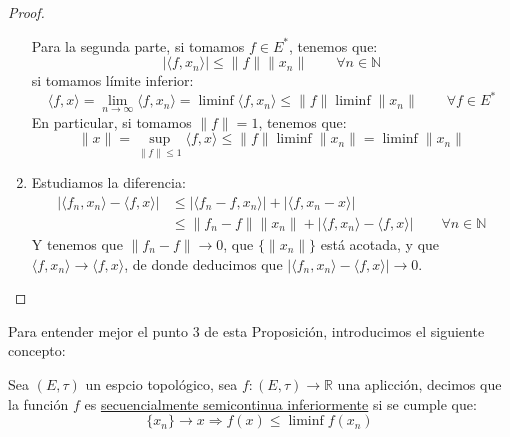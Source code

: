 \begin{prop}
\begin{proof}
\begin{enumerate}
                Para la segunda parte, si tomamos $f\in E^\ast$, tenemos que:
                \begin{equation*}
                    |\langle f,x_n \rangle | \leq \|f\|\|x_n\| \qquad \forall n\in \mathbb{N}
                \end{equation*}
                si tomamos límite inferior:
                \begin{equation*}
                    \langle f,x \rangle = \lim_{n\to\infty}\langle f,x_n \rangle  = \liminf \langle f,x_n \rangle  \leq \|f\|\liminf \|x_n\| \qquad \forall f\in E^\ast
                \end{equation*}
                En particular, si tomamos $\|f\| = 1$, tenemos que:
                \begin{equation*}
                    \|x\| = \sup_{\|f\|\leq 1}\langle f,x \rangle  \leq \|f\| \liminf \|x_n\| = \liminf \|x_n\|
                \end{equation*}
            \item Estudiamos la diferencia:
                \begin{align*}
                    |\langle f_n,x_n \rangle  - \langle f,x \rangle | &\leq |\langle f_n-f,x_n \rangle | + |\langle f,x_n-x \rangle |  \\
                                                                      &\leq \|f_n-f\| \|x_n\| + |\langle f,x_n \rangle -\langle f,x \rangle | \qquad \forall n\in \mathbb{N}
                \end{align*}
                Y tenemos que $\|f_n-f\| \to 0$, que $\{\|x_n\|\}$ está acotada, y que $\langle f,x_n \rangle \to \langle f,x \rangle $, de donde deducimos que $|\langle f_n,x_n \rangle -\langle f,x \rangle |\to 0$.
        \end{enumerate}
    \end{proof}
\end{prop}

\noindent
Para entender mejor el punto 3 de esta Proposición, introducimos el siguiente concepto:
\begin{definicion}
    Sea $(E,\tau)$ un espcio topológico, sea $f:(E,\tau)\to \mathbb{R}$ una aplicción, decimos que la función $f$ es \underline{secuencialmente semicontinua inferiormente} si se cumple que:
    \begin{equation*}
        \{x_n\} \to x \Longrightarrow f(x) \leq \liminf f(x_n)
    \end{equation*}
\end{definicion}~\\

